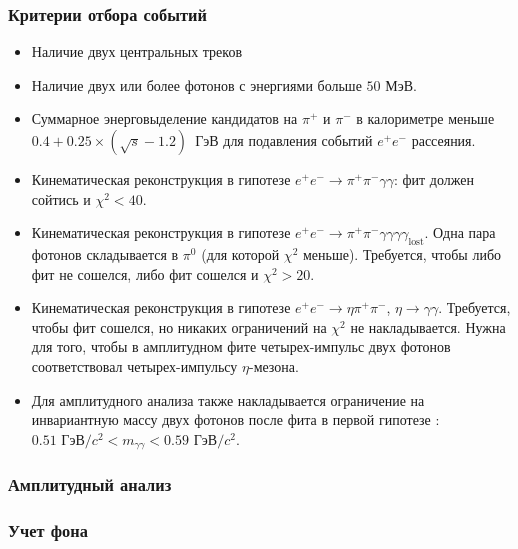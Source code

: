 \documentclass{beamer}
\begin{document}
\begin{frame}
  \frametitle{Критерии отбора событий}
  \scriptsize
  \begin{itemize}
    \item Наличие двух центральных треков
    \item Наличие двух или более фотонов с энергиями больше $50\text{ МэВ}$.
    \item Суммарное энерговыделение кандидатов на $\pi^+$ и $\pi^-$ в калориметре меньше
      $0.4 + 0.25\times(\sqrt{s} - 1.2)$~ГэВ для подавления событий $e^+e^-$ рассеяния.
    \item Кинематическая реконструкция
      в гипотезе $e^+e^-\rightarrow\pi^+\pi^-\gamma\gamma$: фит должен сойтись
      и $\chi^2<40$.
    \item Кинематическая реконструкция в гипотезе $e^+e^-\rightarrow\pi^+\pi^-\gamma\gamma\gamma\gamma_{\text{lost}}$. Одна
      пара фотонов складывается в $\pi^0$ (для которой $\chi^2$ меньше). Требуется, чтобы
      либо фит не сошелся, либо фит сошелся и $\chi^2>20$.
    \item Кинематическая реконструкция в гипотезе $e^+e^-\rightarrow\eta\pi^+\pi^-$, $\eta\rightarrow\gamma\gamma$. Требуется,
      чтобы фит сошелся, но никаких ограничений на $\chi^2$ не накладывается. Нужна
      для того, чтобы в амплитудном фите четырех-импульс двух фотонов
      соответствовал четырех-импульсу $\eta$-мезона.
    \item Для амплитудного анализа также накладывается ограничение на инвариантную
      массу двух фотонов после фита в первой гипотезе : $0.51\text{ ГэВ}/c^2 < m_{\gamma\gamma} < 0.59\text{ ГэВ}/c^2$.
  \end{itemize}
\end{frame}

\begin{frame}
  \frametitle{Амплитудный анализ}
\end{frame}

\begin{frame}
  \frametitle{Учет фона}
\end{frame}
\end{document}
